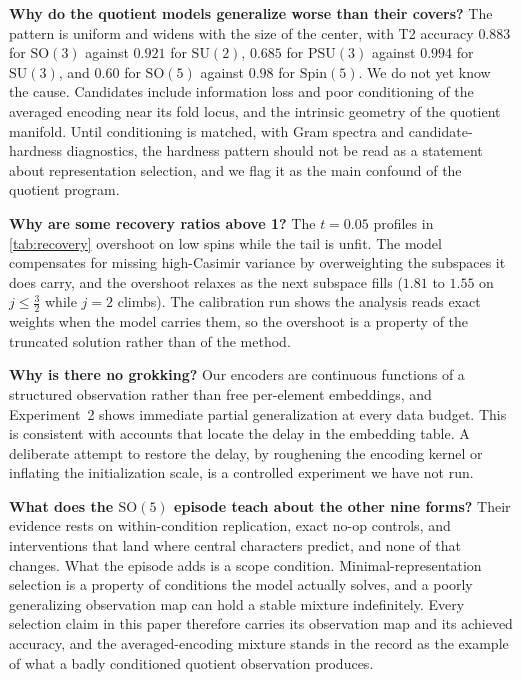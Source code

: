\documentclass{article}
\newcommand{\SU}{\mathrm{SU}}
\newcommand{\SO}{\mathrm{SO}}
\newcommand{\PSU}{\mathrm{PSU}}
\newcommand{\Spin}{\mathrm{Spin}}
\begin{document}
\textbf{Why do the quotient models generalize worse than their
covers?} The pattern is uniform and widens with the size of the center, with T2
accuracy $0.883$ for $\SO(3)$ against $0.921$ for $\SU(2)$, $0.685$ for
$\PSU(3)$ against $0.994$ for $\SU(3)$, and $0.60$ for $\SO(5)$ against
$0.98$ for $\Spin(5)$. We do not yet know the
cause. Candidates include information loss and poor conditioning of
the averaged encoding near its fold locus, and the intrinsic
geometry of the quotient manifold. Until conditioning is matched,
with Gram spectra and candidate-hardness diagnostics, the hardness
pattern should not be read as a statement about representation
selection, and we flag it as the main confound of the quotient
program.

\textbf{Why are some recovery ratios above 1?} The $t = 0.05$
profiles in \cref{tab:recovery} overshoot on low spins while the
tail is unfit. The model compensates for missing high-Casimir
variance by overweighting the subspaces it does carry, and the
overshoot relaxes as the next subspace fills ($1.81$ to $1.55$ on
$j \leq \tfrac32$ while $j = 2$ climbs). The calibration run shows
the analysis reads exact weights when the model carries them, so the
overshoot is a property of the truncated solution rather than of the
method.

\textbf{Why is there no grokking?} Our encoders are continuous
functions of a structured observation rather than free per-element
embeddings, and Experiment~2 shows immediate partial generalization
at every data budget. This is consistent with accounts that locate
the delay in the embedding table. A deliberate attempt to restore
the delay, by roughening the encoding kernel or inflating the
initialization scale, is a controlled experiment we have not run.

\textbf{What does the $\SO(5)$ episode teach about the other nine
forms?} Their evidence rests on within-condition replication, exact
no-op controls, and interventions that land where central characters
predict, and none of that changes. What the episode adds is a scope
condition. Minimal-representation selection is a property of conditions
the model actually solves, and a poorly generalizing observation map can
hold a stable mixture indefinitely. Every selection claim in this paper
therefore carries its observation map and its achieved accuracy, and the
averaged-encoding mixture stands in the record as the example of what a
badly conditioned quotient observation produces.
\end{document}
